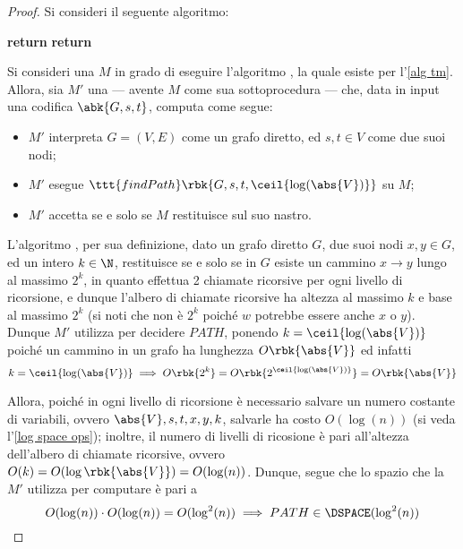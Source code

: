 \documentclass[a4paper, 12pt]{report}
\begin{document}
    \begin{proof}
        Si consideri il seguente algoritmo:

        \begin{algorithmic}[1]
                        \State \textbf{return} 
                    \Else
                        \State \textbf{return} 
                    \EndIf
                            \State {} 
                        \EndIf
                    \EndFor

                    \State {} 
                \EndIf
            \EndFunction
        \end{algorithmic}

        Si consideri una \TM $M$ in grado di eseguire l'algoritmo , la quale esiste per l'\cref{alg tm}. Allora, sia $M'$ una \TM --- avente $M$ come sua sottoprocedura --- che, data in input una codifica $\abk{G, s, t}$, computa come segue:

        \begin{itemize}
            \item $M'$ interpreta $G = (V, E)$ come un grafo diretto, ed $s, t \in V$ come due suoi nodi;
            \item $M'$ esegue $\ttt{findPath}\rbk{G, s, t, \ceil{\log(\abs{V})}}$ su $M$;
            \item $M'$ accetta se e solo se $M$ restituisce  sul suo nastro.
        \end{itemize}

        L'algoritmo , per sua definizione, dato un grafo diretto $G$, due suoi nodi $x, y \in G$, ed un intero $k \in \N$, restituisce  se e solo se in $G$ esiste un cammino $x \to y$ lungo al massimo $2^k$, in quanto  effettua 2 chiamate ricorsive per ogni livello di ricorsione, e dunque l'albero di chiamate ricorsive ha altezza al massimo $k$ e base al massimo $2^k$ (si noti che non è  $2^k$ poiché $w$ potrebbe essere anche $x$ o $y$). Dunque $M'$ utilizza  per decidere $PATH$, ponendo $k = \ceil{\log(\abs{V})}$ poiché un cammino in un grafo ha lunghezza $O\rbk{\abs{V}}$ ed infatti $$k = \ceil{\log(\abs{V})} \implies O\rbk{2^k} = O\rbk{2^{\ceil{\log(\abs{V})}}} = O\rbk{\abs{V}}$$

        Allora, poiché in ogni livello di ricorsione è necessario salvare un numero costante di variabili, ovvero $\abs{V}, s, t, x, y, k$, salvarle ha costo $O(\log(n))$ (si veda l'\cref{log space ops}); inoltre, il numero di livelli di ricosione è pari all'altezza dell'albero di chiamate ricorsive, ovvero $O(k) = O(\log \rbk{\abs{V}}) = O(\log(n))$. Dunque, segue che lo spazio che la \TM $M'$ utilizza per computare è pari a $$O(\log(n)) \cdot O(\log(n)) = O(\log^2(n)) \implies PATH \in \DSPACE(\log^2(n))$$
    \end{proof}
\end{document}
